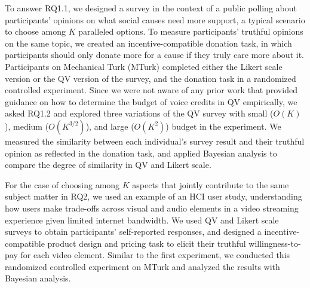 To answer RQ1.1, we designed a survey in the context of a public polling about participants' opinions on what social causes need more support, a typical scenario to choose among $K$ paralleled options. To measure participants' truthful opinions on the same topic, we created an incentive-compatible donation task, in which participants should only donate more for a cause if they truly care more about it. Participants on Mechanical Turk (MTurk) completed either the Likert scale version or the QV version of the survey, and the donation task in a randomized controlled experiment. Since we were not aware of any prior work that provided guidance on how to determine the budget of voice credits in QV empirically, we asked RQ1.2 and explored three variations of the QV survey with small ($O(K)$), medium ($O(K^{3/2})$), and large ($O(K^2)$) budget in the experiment. We measured the similarity between each individual's survey result and their truthful opinion as reflected in the donation task, and applied Bayesian analysis to compare the degree of similarity in QV and Likert scale.

For the case of choosing among $K$ aspects that jointly contribute to the same subject matter in RQ2, we used an example of an HCI user study, understanding how users make trade-offs across visual and audio elements in a video streaming experience given limited internet bandwidth. We used QV and Likert scale surveys to obtain participants' self-reported responses, and designed a incentive-compatible product design and pricing task to elicit their truthful willingness-to-pay for each video element. Similar to the first experiment, we conducted this randomized controlled experiment on MTurk and analyzed the results with Bayesian analysis.




